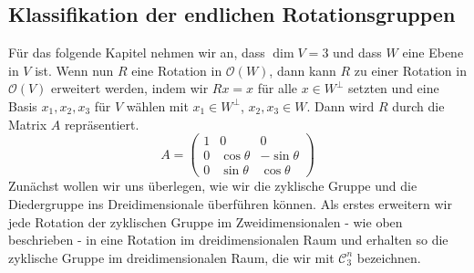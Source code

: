 \subsection{Klassifikation der endlichen Rotationsgruppen}
Für das folgende Kapitel nehmen wir an, dass $\dim V = 3$ und dass $W$ eine Ebene in $V$ ist. Wenn nun $R$ eine Rotation in $\mathcal{O}(W)$, dann kann $R$ zu einer Rotation in $\mathcal{O}(V)$ erweitert werden, indem wir $Rx=x$ für alle $x \in W^\perp$ setzten und eine Basis ${x_1,x_2,x_3}$ für $V$ wählen mit $x_1 \in W^\perp$, $x_2, x_3 \in W$. Dann wird $R$ durch die Matrix $A$ repräsentiert.
$$A=\begin{pmatrix}
1 & 0 & 0 \\
0 & \cos{\theta} & -\sin{\theta} \\
0 & \sin{\theta} & \cos{\theta}
\end{pmatrix} $$ 
Zunächst wollen wir uns überlegen, wie wir die zyklische Gruppe und die Diedergruppe ins Dreidimensionale überführen können. Als erstes erweitern wir jede Rotation der zyklischen Gruppe im Zweidimensionalen - wie oben beschrieben - in eine Rotation im dreidimensionalen Raum und erhalten so die zyklische Gruppe im dreidimensionalen Raum, die wir mit $\mathcal{C}_3^n$ bezeichnen. 

